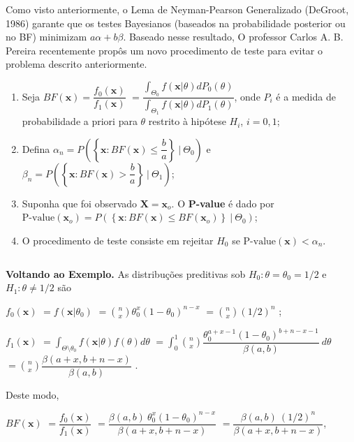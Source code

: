\documentclass[
]{book}
\begin{document}
\(~\)

Como visto anteriormente, o Lema de Neyman-Pearson Generalizado (DeGroot, 1986) garante que os testes Bayesianos (baseados na probabilidade posterior ou no BF) minimizam \(a\alpha + b\beta\). Baseado nesse resultado, O professor Carlos A. B. Pereira recentemente propôs um novo procedimento de teste para evitar o problema descrito anteriormente.

\begin{enumerate}
\def\labelenumi{\arabic{enumi}.}
\item
  Seja \(BF(\boldsymbol x) = \dfrac{f_0(\boldsymbol x)}{f_1(\boldsymbol x)}\)
  \(=\dfrac{\displaystyle\int_{\Theta_0} f(\boldsymbol x|\theta) dP_0(\theta)}{\displaystyle \int_{\Theta_1} f(\boldsymbol x|\theta) dP_1(\theta)}\), onde \(P_i\) é a medida de probabilidade a priori para \(\theta\) restrito à hipótese \(H_i\), \(i=0,1\);
\item
  Defina
  \(\alpha_n = P\left(\left\{\boldsymbol x : BF(\boldsymbol x)\leq\dfrac{b}{a}\right\} ~\Big|~ \Theta_0\right)\) e
  \(\beta_n = P\left(\left\{\boldsymbol x : BF(\boldsymbol x)>\dfrac{b}{a}\right\} ~\Big|~ \Theta_1\right)\);
\item
  Suponha que foi observado \(\boldsymbol X=\boldsymbol x_o\). O \textbf{P-value} é dado por
  \(\text{P-value}(\boldsymbol x_o) = P\left(\left\{\boldsymbol x : BF(\boldsymbol x)\leq BF(\boldsymbol x_o)\right\} ~\Big|~ \Theta_0\right)\);
\item
  O procedimento de teste consiste em rejeitar \(H_0\) se \(\text{P-value}(\boldsymbol x) < \alpha_n\).
\end{enumerate}

\(~\)

\textbf{Voltando ao Exemplo.} As distribuções preditivas sob \(H_0: \theta=\theta_0=1/2\) e \(H_1:\theta \neq 1/2\) são

\(f_0(\boldsymbol x)\) \(= f(\boldsymbol x | \theta_0)\)
\(=\displaystyle \binom{n}{x} {\theta}_0^x (1-{\theta}_0)^{n-x}\)
\(=\displaystyle \binom{n}{x} {(1/2)^{n}}\) ;

\(f_1(\boldsymbol x)\)
\(=\displaystyle \int_{\Theta\setminus\theta_0} f(\boldsymbol x|\theta) f(\theta) d\theta\)
\(=\displaystyle \int_0^1 \binom{n}{x} \dfrac{{\theta}_0^{a+x-1} (1-{\theta}_0)^{b+n-x-1}}{\beta(a,b)}~d\theta\)
\(=\displaystyle \binom{n}{x}\dfrac{\beta(a+x,b+n-x)}{\beta(a,b)}\) .

Deste modo,

\(BF(\boldsymbol x)\) \(=\dfrac{f_0(\boldsymbol x)}{f_1(\boldsymbol x)}\)
\(=\dfrac{\beta(a,b)~{\theta}_0^x (1-{\theta}_0)^{n-x}}{\beta(a+x,b+n-x)}\)
\(=\dfrac{\beta(a,b)~(1/2)^{n}}{\beta(a+x,b+n-x)}\),
\end{document}
